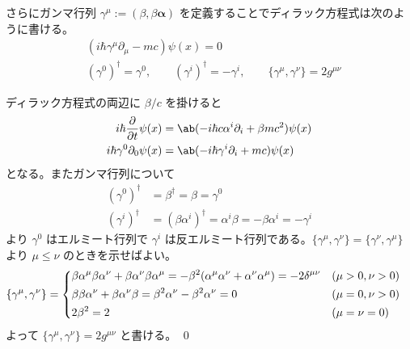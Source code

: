 \documentclass[uplatex,dvipdfmx,a4paper,11pt]{jlreq}
\makeatletter
\numberwithin{equation}{section}
\theoremstyle{definition}
\renewenvironment{proof}[1][\proofname]{\par
  \normalfont
  \topsep6\p@\@plus6\p@ \trivlist
  \item[\hskip\labelsep{\bfseries #1}\@addpunct{\bfseries}]\ignorespaces\quad\par
}{%
  \qed\endtrivlist\@endpefalse
}
\renewcommand\proofname{証明}
\makeatother
\begin{document}
\begin{theorem}
  さらにガンマ行列 $\gamma^\mu := (\beta, \beta\bm{\alpha})$ を定義することでディラック方程式は次のように書ける。
  \begin{align}
     & (i\hbar\gamma^\mu \partial_\mu - mc)\psi(x) = 0                                                                                 \\
     & (\gamma^0)^\dagger = \gamma^0, \qquad (\gamma^i)^\dagger = -\gamma^i, \qquad \lbrace\gamma^\mu, \gamma^\nu\rbrace = 2g^{\mu\nu}
  \end{align}
\end{theorem}
\begin{proof}
  ディラック方程式の両辺に $\beta/c$ を掛けると
  \begin{align}
    i\hbar\diffp{}{t}\psi(x)        & = \ab(-i\hbar c\alpha^i\partial_i + \beta mc^2)\psi(x) \\
    i\hbar\gamma^0\partial_0\psi(x) & = \ab(-i\hbar\gamma^i\partial_i + mc)\psi(x)
  \end{align}
  となる。またガンマ行列について
  \begin{align}
    (\gamma^0)^\dagger & = \beta^\dagger = \beta = \gamma^0                                     \\
    (\gamma^i)^\dagger & = (\beta\alpha^i)^\dagger = \alpha^i\beta = -\beta\alpha^i = -\gamma^i
  \end{align}
  より $\gamma^0$ はエルミート行列で $\gamma^i$ は反エルミート行列である。$\lbrace\gamma^\mu, \gamma^\nu\rbrace = \lbrace\gamma^\nu, \gamma^\mu\rbrace$ より $\mu \leq \nu$ のときを示せばよい。
  \begin{align}
    \lbrace\gamma^\mu, \gamma^\nu\rbrace & =
    \begin{dcases}
      \beta\alpha^\mu\beta\alpha^\nu + \beta\alpha^\nu\beta\alpha^\mu = -\beta^2(\alpha^\mu\alpha^\nu + \alpha^\nu\alpha^\mu) = -2\delta^{\mu\nu} & (\mu > 0, \nu > 0) \\
      \beta\beta\alpha^\nu + \beta\alpha^\nu\beta = \beta^2\alpha^\nu - \beta^2\alpha^\nu = 0                                                     & (\mu = 0, \nu > 0) \\
      2\beta^2 = 2                                                                                                                                & (\mu = \nu = 0)
    \end{dcases}
  \end{align}
  よって $\lbrace\gamma^\mu, \gamma^\nu\rbrace = 2g^{\mu\nu}$ と書ける。
\end{proof}
\end{document}
